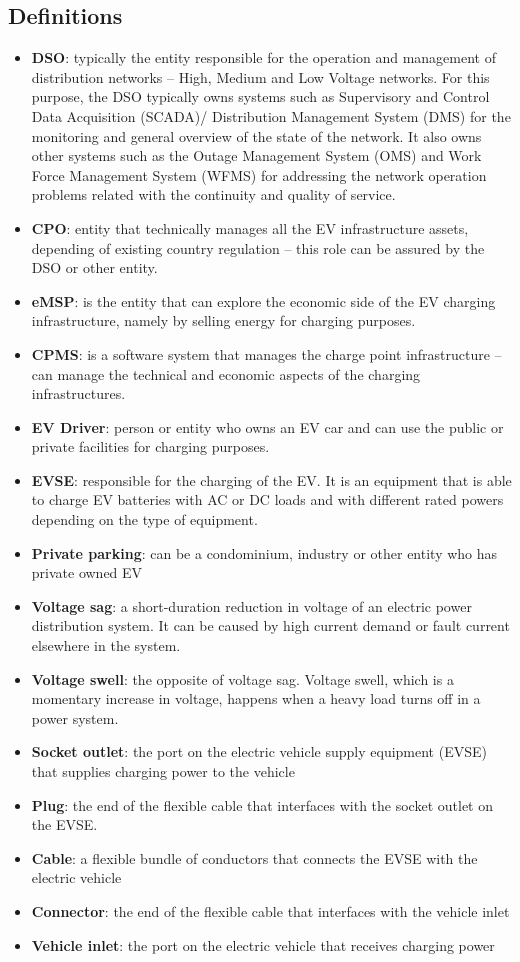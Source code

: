 \subsection{Definitions}
\begin{itemize}
    \item \textbf{DSO}: typically the entity responsible for the operation and management of distribution networks – High, Medium and Low Voltage networks. For this purpose, the DSO typically owns systems such as Supervisory and Control Data Acquisition (SCADA)/ Distribution Management System (DMS) for the monitoring and general overview of the state of the network. It also owns other systems such as the Outage Management System (OMS) and Work Force Management System (WFMS) for addressing the network operation problems related with the continuity and quality of service.
    \item \textbf{CPO}: entity that technically manages all the EV infrastructure assets, depending of existing country regulation – this role can be assured by the DSO or other entity.
    \item \textbf{eMSP}: is the entity that can explore the economic side of the EV charging infrastructure, namely by selling energy for charging purposes.
    \item \textbf{CPMS}: is a software system that manages the charge point infrastructure – can manage the technical and economic aspects of the charging infrastructures.
    \item  \textbf{EV Driver}: person or entity who owns an EV car and can use the public or private facilities for charging purposes.
    \item \textbf{EVSE}: responsible for the charging of the EV. It is an equipment that is able to charge EV batteries with AC or DC loads and with different rated powers depending on the type of equipment.
    \item  \textbf{Private parking}: can be a condominium, industry or other entity who has private owned EV
    \item \textbf{Voltage sag}: a short-duration reduction in voltage of an electric power distribution system. It can be caused by high current demand or fault current elsewhere in the system.
    \item \textbf{Voltage swell}: the opposite of voltage sag. Voltage swell, which is a momentary increase in voltage, happens when a heavy load turns off in a power system.
    \item \textbf{Socket outlet}: the port on the electric vehicle supply equipment (EVSE) that supplies charging power to the vehicle
    \item \textbf{Plug}: the end of the flexible cable that interfaces with the socket outlet on the EVSE.
    \item \textbf{Cable}: a flexible bundle of conductors that connects the EVSE with the electric vehicle
    \item \textbf{Connector}: the end of the flexible cable that interfaces with the vehicle inlet
    \item \textbf{Vehicle inlet}: the port on the electric vehicle that receives charging power
\end{itemize}

